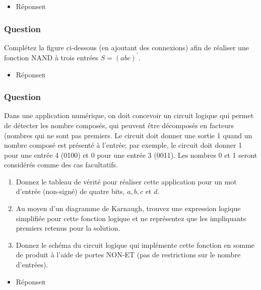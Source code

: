 \documentclass[11pt]{article}
\begin{document}
\begin{itemize}
\item Réponse\hfill{}\textsc{r}
\label{sec:org483dae4}
\end{itemize}

\subsubsection*{Question}
\label{sec:org3b8fed9}
Complétez la figure ci-dessous (en ajoutant des connexions) afin de
  réaliser une  fonction NAND à trois entrées \(S = (a b c)^\prime\).
  \begin{center}

\end{center}

\begin{itemize}
\item Réponse\hfill{}\textsc{r}
\label{sec:orgfb61717}
\end{itemize}

\subsubsection*{Question}
\label{sec:orgaabb8d8}
Dans une application numérique, on doit concevoir un circuit logique
qui permet de détecter les nombre composés, qui peuvent être
décomposés en facteurs (nombres qui ne sont pas premiers. Le circuit
doit donner une sortie 1 quand un nombre composé est présenté à
l'entrée; par exemple, le circuit doit donner 1 pour une entrée 4
(0100) et 0 pour une entrée 3 (0011). Les nombres 0 et 1 seront
considérés comme des cas facultatifs.

\begin{enumerate}
\item Donnez le tableau de vérité pour réaliser cette application pour
un mot d'entrée (non-signé) de quatre bits, \(a, b, c\) et \(d\).

\item Au moyen d'un diagramme de Karnaugh, trouvez une expression
logique simplifiée pour cette fonction logique et ne représentez
que les impliquants premiers retenus pour la solution.

\item Donnez le schéma du circuit logique qui implémente cette fonction
en somme de produit à l'aide de portes NON-ET (pas de restrictions
sur le nombre d'entrées).
\end{enumerate}

\begin{itemize}
\item Réponse\hfill{}\textsc{r}
\label{sec:org259a94e}
\end{itemize}
\end{document}
